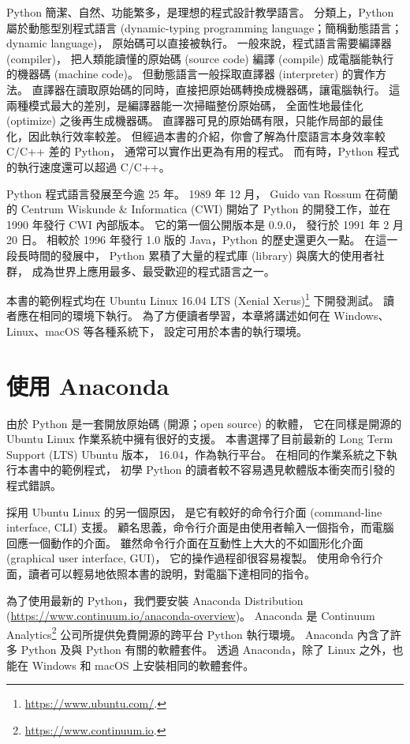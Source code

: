 \documentclass[a4paper,12pt]{book}
\theoremstyle{definition}
\begin{document}
Python 簡潔、自然、功能繁多，是理想的程式設計教學語言。
分類上，Python 屬於動態型別程式語言
(dynamic-typing programming language；簡稱動態語言；dynamic language)，
原始碼可以直接被執行。
一般來說，程式語言需要編譯器 (compiler)，
把人類能讀懂的原始碼 (source code)
編譯 (compile) 成電腦能執行的機器碼 (machine code)。
但動態語言一般採取直譯器 (interpreter) 的實作方法。
直譯器在讀取原始碼的同時，直接把原始碼轉換成機器碼，讓電腦執行。
這兩種模式最大的差別，是編譯器能一次掃瞄整份原始碼，
全面性地最佳化 (optimize) 之後再生成機器碼。
直譯器可見的原始碼有限，只能作局部的最佳化，因此執行效率較差。
但經過本書的介紹，你會了解為什麼語言本身效率較 C/C++ 差的 Python，
通常可以實作出更為有用的程式。
而有時，Python 程式的執行速度還可以超過 C/C++。

Python 程式語言發展至今逾 25 年。
1989 年 12 月，
Guido van Rossum 在荷蘭的 Centrum Wiskunde \& Informatica (CWI) 開始了
Python 的開發工作，並在 1990 年發行 CWI 內部版本。
它的第一個公開版本是 0.9.0，
發行於 1991 年 2 月 20 日\cite{rossum_brief_2009}。
相較於 1996 年發行 1.0 版的 Java，Python 的歷史還更久一點。
在這一段長時間的發展中，
Python 累積了大量的程式庫 (library) 與廣大的使用者社群，
成為世界上應用最多、最受歡迎的程式語言之一。

本書的範例程式均在 Ubuntu Linux 16.04 LTS (Xenial Xerus)\footnote{\url{https://www.ubuntu.com/}.}
下開發測試。
讀者應在相同的環境下執行。
為了方便讀者學習，本章將講述如何在 Windows、Linux、macOS 等各種系統下，
設定可用於本書的執行環境。

\section{使用 Anaconda}
%
\label{c:runtime:anaconda}

由於 Python 是一套開放原始碼 (開源；open source) 的軟體，
它在同樣是開源的 Ubuntu Linux 作業系統中擁有很好的支援。
本書選擇了目前最新的 Long Term Support (LTS) Ubuntu 版本，
16.04，作為執行平台。
在相同的作業系統之下執行本書中的範例程式，
初學 Python 的讀者較不容易遇見軟體版本衝突而引發的程式錯誤。

採用 Ubuntu Linux 的另一個原因，
是它有較好的命令行介面 (command-line interface, CLI) 支援。
顧名思義，命令行介面是由使用者輸入一個指令，而電腦回應一個動作的介面。
雖然命令行介面在互動性上大大的不如圖形化介面 (graphical user interface, GUI)，
它的操作過程卻很容易複製。
使用命令行介面，讀者可以輕易地依照本書的說明，對電腦下達相同的指令。

為了使用最新的 Python，我們要安裝
Anaconda Distribution (\url{https://www.continuum.io/anaconda-overview})。
Anaconda 是 Continuum Analytics\footnote{\url{https://www.continuum.io}.}
公司所提供免費開源的跨平台 Python 執行環境。
Anaconda 內含了許多 Python 及與 Python 有關的軟體套件。
透過 Anaconda，除了 Linux 之外，也能在 Windows 和 macOS 上安裝相同的軟體套件。
\end{document}
